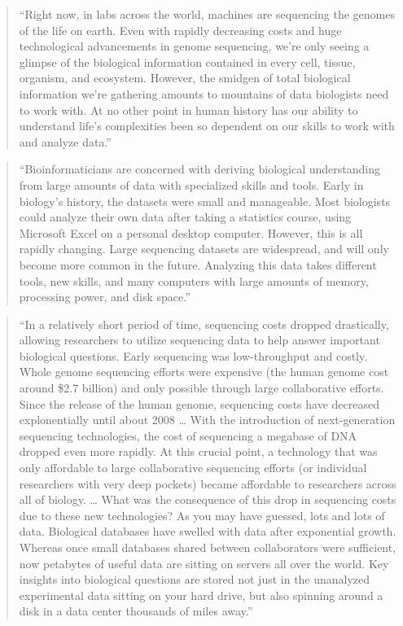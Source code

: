 \documentclass[]{tufte-book}
\begin{document}
\begin{quote}
``Right now, in labs across the world, machines are sequencing the genomes of the life
on earth. Even with rapidly decreasing costs and huge technological advancements in
genome sequencing, we're only seeing a glimpse of the biological information contained
in every cell, tissue, organism, and ecosystem. However, the smidgen of total biological
information we're gathering amounts to mountains of data biologists need to work with. At
no other point in human history has our ability to understand life's complexities been so
dependent on our skills to work with and analyze data.'' \citep{buffalo2015bioinformatics}
\end{quote}

\begin{quote}
``Bioinformaticians are concerned with deriving biological understanding from large
amounts of data with specialized skills and tools. Early in biology's history, the
datasets were small and manageable. Most biologists could analyze their own data after
taking a statistics course, using Microsoft Excel on a personal desktop computer.
However, this is all rapidly changing. Large sequencing datasets are widespread, and will
only become more common in the future. Analyzing this data takes different tools, new skills,
and many computers with large amounts of memory, processing power, and disk space.''
\citep{buffalo2015bioinformatics}
\end{quote}

\begin{quote}
``In a relatively short period of time, sequencing costs dropped drastically, allowing
researchers to utilize sequencing data to help answer important biological questions.
Early sequencing was low-throughput and costly. Whole genome sequencing efforts were
expensive (the human genome cost around \$2.7 billion) and only possible through large
collaborative efforts. Since the release of the human genome, sequencing costs have
decreased explonentially until about 2008 \ldots{} With the introduction of next-generation
sequencing technologies, the cost of sequencing a megabase of DNA dropped even more
rapidly. At this crucial point, a technology that was only affordable to large collaborative
sequencing efforts (or individual researchers with very deep pockets) became affordable
to researchers across all of biology. \ldots{} What was the consequence of this drop in
sequencing costs due to these new technologies? As you may have guessed, lots and lots
of data. Biological databases have swelled with data after exponential growth. Whereas once
small databases shared between collaborators were sufficient, now petabytes of useful
data are sitting on servers all over the world. Key insights into biological questions are
stored not just in the unanalyzed experimental data sitting on your hard drive, but also
spinning around a disk in a data center thousands of miles away.'' \citep{buffalo2015bioinformatics}
\end{quote}
\end{document}
